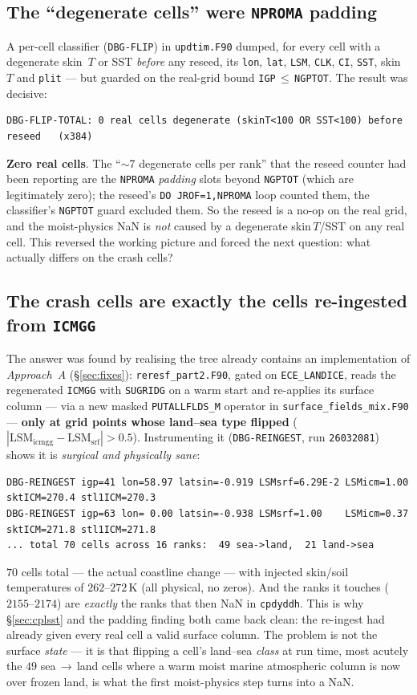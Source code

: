 \documentclass[11pt,a4paper]{article}
\newcommand{\code}[1]{\texttt{\small #1}}
\newcommand{\file}[1]{\texttt{\footnotesize #1}}
\begin{document}
\subsection{The ``degenerate cells'' were \code{NPROMA} padding}
A per-cell classifier (\code{DBG-FLIP}) in \file{updtim.F90} dumped, for every cell with a
degenerate skin~$T$ or SST \emph{before} any reseed, its \code{lon}, \code{lat},
\code{LSM}, \code{CLK}, \code{CI}, \code{SST}, skin~$T$ and \code{plit} --- but guarded on
the real-grid bound \code{IGP}$\,\le\,$\code{NGPTOT}. The result was decisive:
\begin{lstlisting}
DBG-FLIP-TOTAL: 0 real cells degenerate (skinT<100 OR SST<100) before reseed   (x384)
\end{lstlisting}
\textbf{Zero real cells}. The ``$\sim$7 degenerate cells per rank'' that the reseed counter
had been reporting are the \code{NPROMA} \emph{padding} slots beyond \code{NGPTOT} (which
are legitimately zero); the reseed's \code{DO JROF=1,NPROMA} loop counted them, the
classifier's \code{NGPTOT} guard excluded them. So the reseed is a no-op on the real grid,
and the moist-physics NaN is \emph{not} caused by a degenerate skin\,$T$/SST on any real
cell. This reversed the working picture and forced the next question: what actually differs
on the crash cells?

\subsection{The crash cells are exactly the cells re-ingested from \code{ICMGG}}\label{sec:reingest}
The answer was found by realising the tree already contains an implementation of
\emph{Approach~A} (\S\ref{sec:fixes}): \file{reresf\_part2.F90}, gated on
\code{ECE\_LANDICE}, reads the regenerated \code{ICMGG} with \code{SUGRIDG} on a warm start
and re-applies its surface column --- via a new masked \code{PUTALLFLDS\_M} operator in
\file{surface\_fields\_mix.F90} --- \textbf{only at grid points whose land--sea type
flipped} ($|\mathrm{LSM}_{\text{icmgg}}-\mathrm{LSM}_{\text{srf}}|>0.5$). Instrumenting it
(\code{DBG-REINGEST}, run \code{26032081}) shows it is \emph{surgical and physically sane}:
\begin{lstlisting}
DBG-REINGEST igp=41 lon=58.97 latsin=-0.919 LSMsrf=6.29E-2 LSMicm=1.00 sktICM=270.4 stl1ICM=270.3
DBG-REINGEST igp=63 lon= 0.00 latsin=-0.938 LSMsrf=1.00    LSMicm=0.37 sktICM=271.8 stl1ICM=271.8
... total 70 cells across 16 ranks:  49 sea->land,  21 land->sea
\end{lstlisting}
$70$ cells total --- the actual coastline change --- with injected skin/soil temperatures
of $262$--$272$\,K (all physical, no zeros). And the ranks it touches ($2155$--$2174$) are
\emph{exactly} the ranks that then NaN in \code{cpdyddh}. This is why \S\ref{sec:cplsst}
and the padding finding both came back clean: the re-ingest had already given every real
cell a valid surface column. The problem is not the surface \emph{state} --- it is that
flipping a cell's land--sea \emph{class} at run time, most acutely the $49$
sea\,$\to$\,land cells where a warm moist marine atmospheric column is now over frozen
land, is what the first moist-physics step turns into a NaN.
\end{document}
